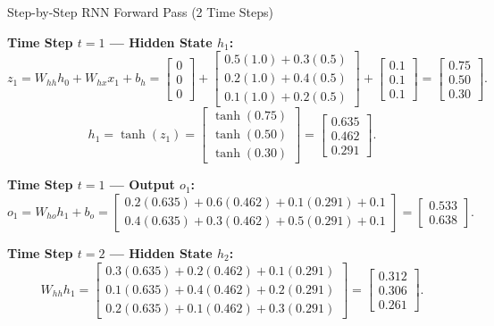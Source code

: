 \documentclass[a4paper,11pt]{article}
\begin{document}
\begin{worked}{Step-by-Step RNN Forward Pass (2 Time Steps)}
\begin{steps}
  \item \textbf{Time Step $t=1$ — Hidden State $h_1$:}
        $$z_1 = W_{hh} h_0 + W_{hx} x_1 + b_h = \begin{bmatrix} 0 \\ 0 \\ 0 \end{bmatrix} + \begin{bmatrix} 0.5(1.0)+0.3(0.5) \\ 0.2(1.0)+0.4(0.5) \\ 0.1(1.0)+0.2(0.5) \end{bmatrix} + \begin{bmatrix} 0.1 \\ 0.1 \\ 0.1 \end{bmatrix} = \begin{bmatrix} 0.75 \\ 0.50 \\ 0.30 \end{bmatrix}.$$
        $$h_1 = \tanh(z_1) = \begin{bmatrix} \tanh(0.75) \\ \tanh(0.50) \\ \tanh(0.30) \end{bmatrix} = \begin{bmatrix} 0.635 \\ 0.462 \\ 0.291 \end{bmatrix}.$$
  \item \textbf{Time Step $t=1$ — Output $o_1$:}
        $$o_1 = W_{ho} h_1 + b_o = \begin{bmatrix} 0.2(0.635)+0.6(0.462)+0.1(0.291) + 0.1 \\ 0.4(0.635)+0.3(0.462)+0.5(0.291) + 0.1 \end{bmatrix} = \begin{bmatrix} 0.533 \\ 0.638 \end{bmatrix}.$$
  \item \textbf{Time Step $t=2$ — Hidden State $h_2$:}
        $$W_{hh} h_1 = \begin{bmatrix} 0.3(0.635)+0.2(0.462)+0.1(0.291) \\ 0.1(0.635)+0.4(0.462)+0.2(0.291) \\ 0.2(0.635)+0.1(0.462)+0.3(0.291) \end{bmatrix} = \begin{bmatrix} 0.312 \\ 0.306 \\ 0.261 \end{bmatrix}.$$

\end{steps}
\end{worked}
\end{document}
